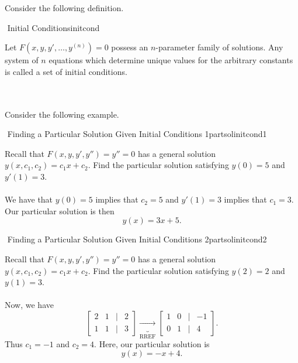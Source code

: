        Consider the following definition.
        \begin{definition}{\Stop\,\,Initial Conditions}{initcond}

            Let \(F(x,y,y',\ldots,y^{(n)})=0\) possess an \(n\)-parameter family of solutions. Any system of \(n\) equations which determine unique values for the arbitrary constants is called a set of initial conditions.
            
        \end{definition}
        \vphantom
        \\
        \\
        Consider the following example.
        \begin{example}{\Stop\,\,Finding a Particular Solution Given Initial Conditions 1}{partsolinitcond1}

            Recall that \(F(x,y,y',y'')=y''=0\) has a general solution \(y(x,c_1,c_2)=c_1x+c_2\). Find the particular solution satisfying \(y(0)=5\) and \(y'(1)=3\).
            \\
            \\
            We have that \(y(0)=5\) implies that \(c_2=5\) and \(y'(1)=3\) implies that \(c_1=3\). Our particular solution is then
            \begin{equation*}
                y(x)=3x+5.
            \end{equation*}
            
        \end{example}
        \begin{example}{\Stop\,\,Finding a Particular Solution Given Initial Conditions 2}{partsolinitcond2}

            Recall that \(F(x,y,y',y'')=y''=0\) has a general solution \(y(x,c_1,c_2)=c_1x+c_2\). Find the particular solution satisfying \(y(2)=2\) and \(y(1)=3\).
            \\
            \\
            Now, we have
            \begin{equation*}
                \begin{bmatrix}
                    2 & 1 & | & 2 \\
                    1 & 1 & | & 3
                \end{bmatrix}\underbrace{\to}_{\text{RREF}}\begin{bmatrix}
                    1 & 0 & | & -1 \\
                    0 & 1 & | & 4 
                \end{bmatrix}.
            \end{equation*}
            Thus \(c_1=-1\) and \(c_2=4\). Here, our particular solution is
            \begin{equation*}
                y(x)=-x+4.
            \end{equation*}
            
        \end{example}

